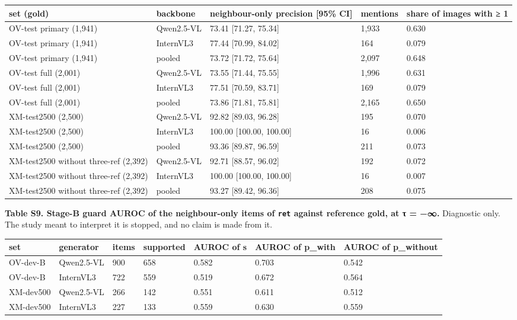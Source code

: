 \begin{longtable}[]{@{}lllll@{}}
\toprule\noalign{}
set (gold) & backbone & neighbour-only precision {[}95\% CI{]} & mentions & share of images with ≥
1 \\
\midrule\noalign{}
\endhead
\bottomrule\noalign{}
\endlastfoot
OV-test primary (1,941) & Qwen2.5-VL & 73.41 {[}71.27, 75.34{]} & 1,933 & 0.630 \\
OV-test primary (1,941) & InternVL3 & 77.44 {[}70.99, 84.02{]} & 164 & 0.079 \\
OV-test primary (1,941) & pooled & 73.72 {[}71.72, 75.64{]} & 2,097 & 0.648 \\
OV-test full (2,001) & Qwen2.5-VL & 73.55 {[}71.44, 75.55{]} & 1,996 & 0.631 \\
OV-test full (2,001) & InternVL3 & 77.51 {[}70.59, 83.71{]} & 169 & 0.079 \\
OV-test full (2,001) & pooled & 73.86 {[}71.81, 75.81{]} & 2,165 & 0.650 \\
XM-test2500 (2,500) & Qwen2.5-VL & 92.82 {[}89.03, 96.28{]} & 195 & 0.070 \\
XM-test2500 (2,500) & InternVL3 & 100.00 {[}100.00, 100.00{]} & 16 & 0.006 \\
XM-test2500 (2,500) & pooled & 93.36 {[}89.87, 96.59{]} & 211 & 0.073 \\
XM-test2500 without three-ref (2,392) & Qwen2.5-VL & 92.71 {[}88.57, 96.02{]} & 192 & 0.072 \\
XM-test2500 without three-ref (2,392) & InternVL3 & 100.00 {[}100.00, 100.00{]} & 16 & 0.007 \\
XM-test2500 without three-ref (2,392) & pooled & 93.27 {[}89.42, 96.36{]} & 208 & 0.075 \\
\end{longtable}

\textbf{Table S9. Stage-B guard AUROC of the neighbour-only items of \texttt{ret} against reference
gold, at τ = −∞.} Diagnostic only. The study meant to interpret it is stopped, and no claim is made
from it.

\begin{longtable}[]{@{}lllllll@{}}
\toprule\noalign{}
set & generator & items & supported & AUROC of s & AUROC of p\_with & AUROC of p\_without \\
\midrule\noalign{}
\endhead
\bottomrule\noalign{}
\endlastfoot
OV-dev-B & Qwen2.5-VL & 900 & 658 & 0.582 & 0.703 & 0.542 \\
OV-dev-B & InternVL3 & 722 & 559 & 0.519 & 0.672 & 0.564 \\
XM-dev500 & Qwen2.5-VL & 266 & 142 & 0.551 & 0.611 & 0.512 \\
XM-dev500 & InternVL3 & 227 & 133 & 0.559 & 0.630 & 0.559 \\
\end{longtable}

